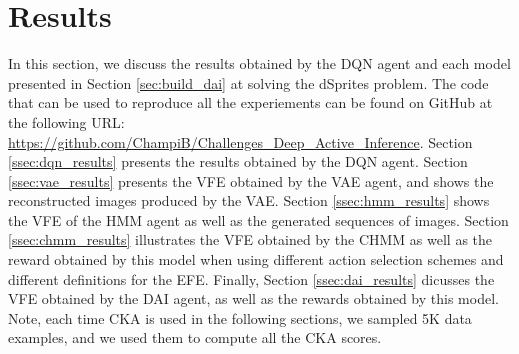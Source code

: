 \documentclass[twoside,11pt]{article}
\begin{document}
\section{Results} \label{sec:results}

In this section, we discuss the results obtained by the DQN agent and each model presented in Section \ref{sec:build_dai} at solving the dSprites problem. The code that can be used to reproduce all the experiements can be found on GitHub at the following URL: \url{https://github.com/ChampiB/Challenges_Deep_Active_Inference}. Section \ref{ssec:dqn_results} presents the results obtained by the DQN agent. Section \ref{ssec:vae_results} presents the VFE obtained by the VAE agent, and shows the reconstructed images produced by the VAE. Section \ref{ssec:hmm_results} shows the VFE of the HMM agent as well as the generated sequences of images. Section \ref{ssec:chmm_results} illustrates the VFE obtained by the CHMM as well as the reward obtained by this model when using different action selection schemes and different definitions for the EFE. Finally, Section \ref{ssec:dai_results} dicusses the VFE obtained by the DAI agent, as well as the rewards obtained by this model. Note, each time CKA is used in the following sections, we sampled 5K data examples, and we used them to compute all the CKA scores. 
\end{document}
